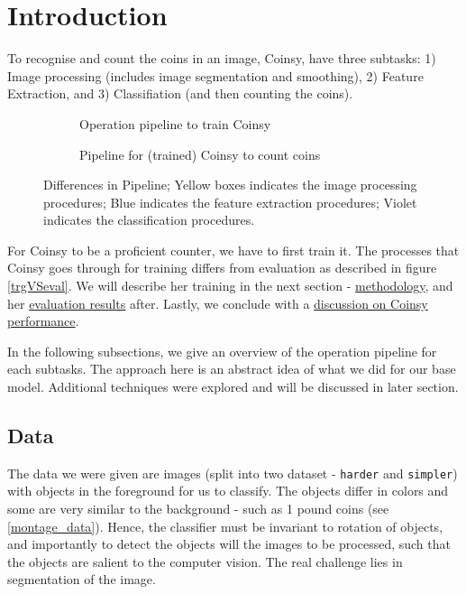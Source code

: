 \documentclass[main.tex]{subfiles}
\begin{document}
\section[intro]{Introduction\hypertarget{sec:intro}{}}
To recognise and count the coins in an image, Coinsy, have three subtasks: 1) Image processing (includes image segmentation and smoothing), 2) Feature Extraction, and 3) Classifiation (and then counting the coins).

\begin{figure}[!t]
  \begin{subfigure}[t]{0.5\textwidth}
    \centering
    \resizebox{\linewidth}{!}{}
    \caption{Operation pipeline to train Coinsy} \label{trgPipe}
  \end{subfigure}
  \begin{subfigure}[t]{0.5\textwidth}
    \centering
    \resizebox{\linewidth}{!}{}
    \caption{Pipeline for (trained) Coinsy to count coins} \label{evalPipe}
  \end{subfigure}
  \caption{Differences in Pipeline; Yellow boxes indicates the image processing procedures; Blue indicates the feature extraction procedures; Violet indicates the classification procedures.} \label{trgVSeval}
\end{figure}

For Coinsy to be a proficient counter, we have to first train it. The processes that Coinsy goes through for training differs from evaluation as described in figure \autoref{trgVSeval}. We will describe her training in the next section - \hyperlink{method}{methodology}, and her \hyperlink{resut}{evaluation results} after. Lastly, we conclude with a \hyperlink{discussion}{discussion on Coinsy performance}.

In the following subsections, we give an overview of the operation pipeline for each subtasks. The approach here is an abstract idea of what we did for our base model. Additional techniques were explored and will be discussed in later section.

\subsection{Data} \label{sec:Data}
The data we were given are images (split into two dataset - \texttt{harder} and \texttt{simpler}) with objects in the foreground for us to classify. The objects differ in colors and some are very similar to the background - such as 1 pound coins (see \autoref{montage_data}). Hence, the classifier must be invariant to rotation of objects, and importantly to detect the objects will the images to be processed, such that the objects are salient to the computer vision. The real challenge lies in segmentation of the image.
\end{document}
